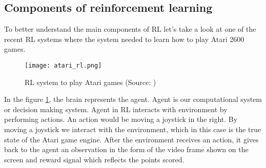 

%
%
%




\subsection{Components of reinforcement learning}
To better understand the main components of RL let's take a
look at one of the recent RL systems where the system
needed to learn how to play Atari 2600 games.

\begin{figure}[H]
	\texttt{[image: atari\_rl.png]}
	\caption{
		RL system to play Atari games (Source: \cite{mnih2013playing})
		}
	\label{img:atari_rl}
\end{figure}
In the figure \ref{img:atari_rl}, the brain represents the agent. Agent is our
computational system or decision making system.
Agent in RL interacts with environment by performing actions. An action would be moving a joystick in the right.
By moving a joystick
we interact with the environment, which in this case is the true state of the Atari game engine.
After the environment receives an action, it gives back to the agent an observation
in the form of the video frame shown on the screen
and reward signal which reflects the points scored.
\\
